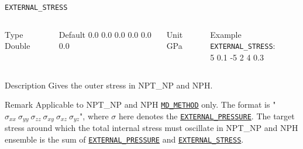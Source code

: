 \begin{frame}[allowframebreaks]{\texttt{EXTERNAL\_STRESS}} \label{EXTERNAL_STRESS}
\vspace*{-12pt}
\begin{columns}
\begin{block}{Type}
Double
\end{block}

\begin{block}{Default}
0.0 0.0 0.0 0.0 0.0 0.0
\end{block}

\begin{block}{Unit}
GPa
\end{block}

\begin{block}{Example}
\texttt{EXTERNAL\_STRESS}: \\ 5 0.1 -5 2 4 0.3
\end{block}
\end{columns}

\begin{block}{Description}
Gives the outer stress in NPT\_NP and NPH.
\end{block}

\begin{block}{Remark}
Applicable to NPT\_NP and NPH \hyperlink{MD_METHOD}{\texttt{MD\_METHOD}} only. The format is "$\sigma_{xx} \ \sigma_{yy} \ \sigma_{zz} \ \sigma_{xy} \ \sigma_{xz} \ \sigma_{yz}$", where $\sigma$ here denotes the \hyperlink{EXTERNAL_PRESSURE}{\texttt{EXTERNAL\_PRESSURE}}. The target stress around which the total internal stress must oscillate in NPT\_NP and NPH ensemble is the sum of \hyperlink{EXTERNAL_PRESSURE}{\texttt{EXTERNAL\_PRESSURE}} and \hyperlink{EXTERNAL_STRESS}{\texttt{EXTERNAL\_STRESS}}.
\end{block}

\end{frame}



